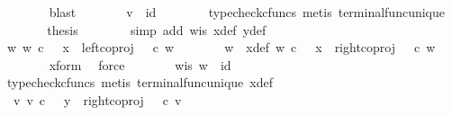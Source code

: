 \begin{isabellebody}
\ \ \ \ \ \ \isamarkupfalse%
\ blast\isanewline
\ \ \ \ \isamarkupfalse%
\ \isamarkupfalse%
\ {\isachardoublequoteopen}v\ {\isacharequal}{\kern0pt}\ id{\isacharparenleft}{\kern0pt}{\isasymone}{\isacharparenright}{\kern0pt}{\isachardoublequoteclose}\isanewline
\ \ \ \ \ \ \isamarkupfalse%
\ {\isacharparenleft}{\kern0pt}typecheck{\isacharunderscore}{\kern0pt}cfuncs{\isacharcomma}{\kern0pt}\ metis\ terminal{\isacharunderscore}{\kern0pt}func{\isacharunderscore}{\kern0pt}unique{\isacharparenright}{\kern0pt}\isanewline
\ \ \ \ \isamarkupfalse%
\ \isamarkupfalse%
\ {\isacharquery}{\kern0pt}thesis\isanewline
\ \ \ \ \ \ \isamarkupfalse%
\ {\isacharparenleft}{\kern0pt}simp\ add{\isacharcolon}{\kern0pt}\ w{\isacharunderscore}{\kern0pt}is\ x{\isacharunderscore}{\kern0pt}def\ y{\isacharunderscore}{\kern0pt}def{\isacharparenright}{\kern0pt}\isanewline
\ \ \isamarkupfalse%
\isanewline
\ \ \ \ \isamarkupfalse%
\ {\isachardoublequoteopen}{\isasymnexists}w{\isachardot}{\kern0pt}\ w\ {\isasymin}\isactrlsub c\ {\isasymone}\ {\isasymand}\ x\ {\isacharequal}{\kern0pt}\ left{\isacharunderscore}{\kern0pt}coproj\ {\isasymone}\ {\isasymone}\ {\isasymcirc}\isactrlsub c\ w{\isachardoublequoteclose}\isanewline
\ \ \ \ \isamarkupfalse%
\ \isamarkupfalse%
\ w\ \ x{\isacharunderscore}{\kern0pt}def{\isacharcolon}{\kern0pt}\ {\isachardoublequoteopen}w\ {\isasymin}\isactrlsub c\ {\isasymone}\ {\isasymand}\ x\ {\isacharequal}{\kern0pt}\ right{\isacharunderscore}{\kern0pt}coproj\ {\isasymone}\ {\isasymone}\ {\isasymcirc}\isactrlsub c\ w{\isachardoublequoteclose}\isanewline
\ \ \ \ \ \ \isamarkupfalse%
\ x{\isacharunderscore}{\kern0pt}form\ \isamarkupfalse%
\ force\isanewline
\ \ \ \ \isamarkupfalse%
\ \isamarkupfalse%
\ w{\isacharunderscore}{\kern0pt}is{\isacharcolon}{\kern0pt}\ {\isachardoublequoteopen}w\ {\isacharequal}{\kern0pt}\ id\ {\isasymone}{\isachardoublequoteclose}\isanewline
\ \ \ \ \ \ \isamarkupfalse%
\ {\isacharparenleft}{\kern0pt}typecheck{\isacharunderscore}{\kern0pt}cfuncs{\isacharcomma}{\kern0pt}\ metis\ terminal{\isacharunderscore}{\kern0pt}func{\isacharunderscore}{\kern0pt}unique\ x{\isacharunderscore}{\kern0pt}def{\isacharparenright}{\kern0pt}\isanewline
\ \ \ \ \isamarkupfalse%
\ {\isachardoublequoteopen}{\isasymexists}\ v{\isachardot}{\kern0pt}\ v\ {\isasymin}\isactrlsub c\ {\isasymone}\ {\isasymand}\ y\ {\isacharequal}{\kern0pt}\ right{\isacharunderscore}{\kern0pt}coproj\ {\isasymone}\ {\isasymone}\ {\isasymcirc}\isactrlsub c\ v{\isachardoublequoteclose}\isanewline

\end{isabellebody}
